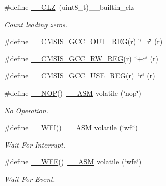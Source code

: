 \begin{DoxyCompactItemize}
\#define \hyperlink{group___c_m_s_i_s___core___instruction_interface_ga5d5bb1527e042be4a9fa5a33f65cc248}{\+\_\+\+\_\+\+C\+LZ}~(uint8\+\_\+t)\+\_\+\+\_\+builtin\+\_\+clz
\begin{DoxyCompactList}\small\item\em Count leading zeros. \end{DoxyCompactList}\item 
\#define \hyperlink{group___c_m_s_i_s___core___instruction_interface_gabc17e391c13c71702366c67cba39c276}{\+\_\+\+\_\+\+C\+M\+S\+I\+S\+\_\+\+G\+C\+C\+\_\+\+O\+U\+T\+\_\+\+R\+EG}(r)~\char`\"{}=r\char`\"{} (r)
\item 
\#define \hyperlink{group___c_m_s_i_s___core___instruction_interface_ga03179f79efee45c226dddfb8d824ad83}{\+\_\+\+\_\+\+C\+M\+S\+I\+S\+\_\+\+G\+C\+C\+\_\+\+R\+W\+\_\+\+R\+EG}(r)~\char`\"{}+r\char`\"{} (r)
\item 
\#define \hyperlink{group___c_m_s_i_s___core___instruction_interface_ga9d94dee7402367961d2cf0accc00fd97}{\+\_\+\+\_\+\+C\+M\+S\+I\+S\+\_\+\+G\+C\+C\+\_\+\+U\+S\+E\+\_\+\+R\+EG}(r)~\char`\"{}r\char`\"{} (r)
\item 
\#define \hyperlink{group___c_m_s_i_s___core___instruction_interface_ga0b13f3617dd4af2cd2eb3a311073f717}{\+\_\+\+\_\+\+N\+OP}()~\hyperlink{cmsis__iccarm_8h_a1378040bcf22428955c6e3ce9c2053cd}{\+\_\+\+\_\+\+A\+SM} volatile (\char`\"{}nop\char`\"{})
\begin{DoxyCompactList}\small\item\em No Operation. \end{DoxyCompactList}\item 
\#define \hyperlink{group___c_m_s_i_s___core___instruction_interface_gab28e2b328c4cf23c917ab18a23194f8e}{\+\_\+\+\_\+\+W\+FI}()~\hyperlink{cmsis__iccarm_8h_a1378040bcf22428955c6e3ce9c2053cd}{\+\_\+\+\_\+\+A\+SM} volatile (\char`\"{}wfi\char`\"{})
\begin{DoxyCompactList}\small\item\em Wait For Interrupt. \end{DoxyCompactList}\item 
\#define \hyperlink{group___c_m_s_i_s___core___instruction_interface_gaf0330712223f4cfb6091e4ab84775f73}{\+\_\+\+\_\+\+W\+FE}()~\hyperlink{cmsis__iccarm_8h_a1378040bcf22428955c6e3ce9c2053cd}{\+\_\+\+\_\+\+A\+SM} volatile (\char`\"{}wfe\char`\"{})
\begin{DoxyCompactList}\small\item\em Wait For Event. \end{DoxyCompactList}\item 

\end{DoxyCompactItemize}
